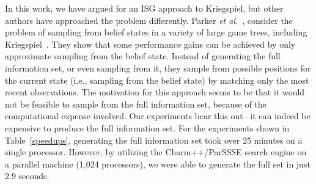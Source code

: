 \documentclass[10pt, conference, compsocconf]{IEEEtran}
\newcommand{\etal}{{\em et al.}\ }
\begin{document}
In this work, we have argued for an ISG approach to Kriegspiel, but other
authors have approached the problem differently.  Parker \etal, consider the
problem of sampling from belief states in a variety of large game trees,
including Kriegspiel~\cite{parker05game}.  They show that some performance gains
can be achieved by only approximate sampling from the belief state.  Instead of
generating the full information set, or even sampling from it, they sample from
possible positions for the current state (i.e., sampling from the belief state)
by matching only the most recent observations.  The motivation for this approach
seems to be that it would not be feasible to sample from the full information
set, because of the computational expense involved. Our experiments bear this
out-- it can indeed be expensive to produce the full information set.  For the
experiments shown in Table~\ref{speedups}, generating the full information set
took over 25 minutes on a single processor.  However, by utilizing the {\sc
Charm++/ParSSSE} search engine on a parallel machine (1,024 processors), we were
able to generate the full set in just 2.9 seconds.    


\end{document}

